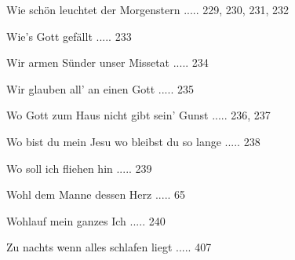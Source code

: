 \documentclass[twocolumn]{book}
\begin{document}
\newline 
Wie schön leuchtet der Morgenstern ..... 229, 230, 231, 232

\newline 
Wie's Gott gefällt ..... 233

\newline 
Wir armen Sünder unser Missetat ..... 234

\newline 
Wir glauben all' an einen Gott ..... 235

\newline 
Wo Gott zum Haus nicht gibt sein' Gunst ..... 236, 237

\newline 
Wo bist du mein Jesu wo bleibst du so lange ..... 238

\newline 
Wo soll ich fliehen hin ..... 239

\newline 
Wohl dem Manne dessen Herz ..... 65

\newline 
Wohlauf mein ganzes Ich ..... 240

\newline 
Zu nachts wenn alles schlafen liegt ..... 407
\end{document}
